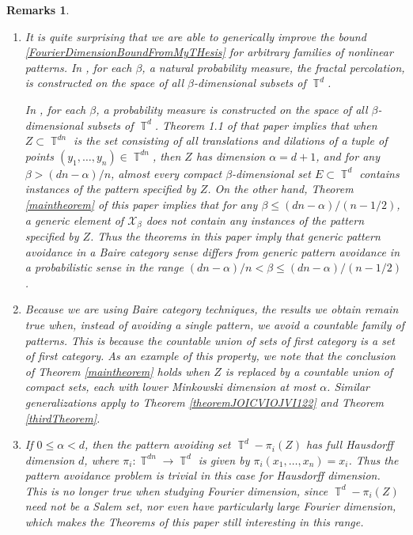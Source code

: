 \documentclass[dvipsnames,letterpaper,12pt]{article}
\numberwithin{equation}{section}
\DeclareMathOperator{\TT}{\mathbb{T}}
\newtheorem{remarks}[theorem]{Remarks}
\numberwithin{theorem}{section}
\begin{document}
\begin{remarks}
    \ 
    \begin{enumerate}
        \item It is quite surprising that we are able to generically improve the bound \eqref{FourierDimensionBoundFromMyTHesis} for arbitrary families of nonlinear patterns. In \cite{Schmerkin2}, for each $\beta$, a natural probability measure, the \emph{fractal percolation}, is constructed on the space of all $\beta$-dimensional subsets of $\TT^d$.


        In \cite{Schmerkin2}, for each $\beta$, a probability measure is constructed on the space of all $\beta$-dimensional subsets of $\TT^d$. Theorem 1.1 of that paper implies that when $Z \subset \TT^{dn}$ is the set consisting of all translations and dilations of a tuple of points $(y_1,\dots,y_n) \in \TT^{dn}$, then $Z$ has dimension $\alpha = d+1$, and for any $\beta > (dn - \alpha)/n$, \emph{almost every} compact $\beta$-dimensional set $E \subset \TT^d$ \emph{contains} instances of the pattern specified by $Z$. On the other hand, Theorem \ref{maintheorem} of this paper implies that for any $\beta \leq (dn - \alpha)/(n-1/2)$, a generic element of $\mathcal{X}_\beta$ does not contain any instances of the pattern specified by $Z$. Thus the theorems in this paper imply that generic pattern avoidance in a Baire category sense differs from generic pattern avoidance in a probabilistic sense in the range $(dn - \alpha)/n < \beta \leq (dn - \alpha)/(n - 1/2)$.

        \item Because we are using Baire category techniques, the results we obtain remain true when, instead of avoiding a single pattern, we avoid a countable family of patterns. This is because the countable union of sets of first category is a set of first category. As an example of this property, we note that the conclusion of Theorem \ref{maintheorem} holds when $Z$ is replaced by a \emph{countable union} of compact sets, each with lower Minkowski dimension at most $\alpha$. Similar generalizations apply to Theorem \ref{theoremJOICVIOJVI122} and Theorem \ref{thirdTheorem}.

        \item If $0 \leq \alpha < d$, then the pattern avoiding set $\TT^d - \pi_i(Z)$ has full Hausdorff dimension $d$, where $\pi_i: \TT^{dn} \to \TT^d$ is given by $\pi_i(x_1,\dots,x_n) = x_i$. Thus the pattern avoidance problem is trivial in this case for Hausdorff dimension. This is no longer true when studying Fourier dimension, since $\TT^d - \pi_i(Z)$ need not be a Salem set, nor even have particularly large Fourier dimension, which makes the Theorems of this paper still interesting in this range.


\end{enumerate}
\end{remarks}
\end{document}
